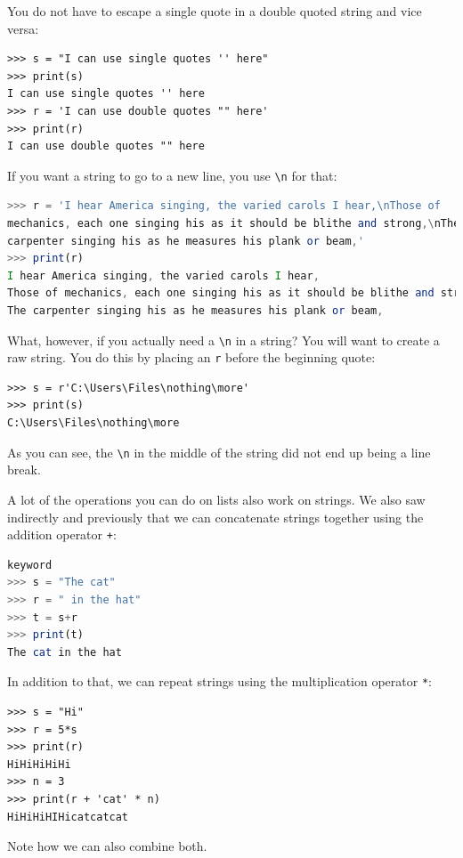 \documentclass[11pt]{cselabheader}
\begin{document}
You do not have to escape a single quote in a double quoted string and vice
versa:
\begin{lstlisting}[style=ipython]
>>> s = "I can use single quotes '' here"
>>> print(s)
I can use single quotes '' here
>>> r = 'I can use double quotes "" here'
>>> print(r)
I can use double quotes "" here
\end{lstlisting}

If you want a string to go to a new line, you use \lstinline!\n! for that:
\begin{lstlisting}[style=ipython,language=Octave,caption={Excerpt of I Hear
America Singing by Walt Whitman}]
>>> r = 'I hear America singing, the varied carols I hear,\nThose of 
mechanics, each one singing his as it should be blithe and strong,\nThe 
carpenter singing his as he measures his plank or beam,'
>>> print(r)
I hear America singing, the varied carols I hear,
Those of mechanics, each one singing his as it should be blithe and strong,
The carpenter singing his as he measures his plank or beam,
\end{lstlisting}

What, however, if you actually need a \lstinline!\n! in a string? You will want
to create a raw string. You do this by placing an \lstinline!r! before the
beginning quote:
\begin{lstlisting}[style=ipython]
>>> s = r'C:\Users\Files\nothing\more'
>>> print(s)
C:\Users\Files\nothing\more
\end{lstlisting}

As you can see, the \lstinline!\n! in the middle of the string did not end up
being a line break.

A lot of the operations you can do on lists also work on strings. We also saw
indirectly and previously that we can concatenate strings together using the
addition operator \lstinline!+!:
\begin{lstlisting}[style=ipython,language=Octave] % octave doesn't have in
keyword
>>> s = "The cat"
>>> r = " in the hat"
>>> t = s+r
>>> print(t)
The cat in the hat
\end{lstlisting}

In addition to that, we can repeat strings using the multiplication operator
\lstinline!*!:
\begin{lstlisting}[style=ipython]
>>> s = "Hi"
>>> r = 5*s
>>> print(r)
HiHiHiHiHi
>>> n = 3
>>> print(r + 'cat' * n)
HiHiHiHIHicatcatcat
\end{lstlisting}
Note how we can also combine both.
\end{document}
